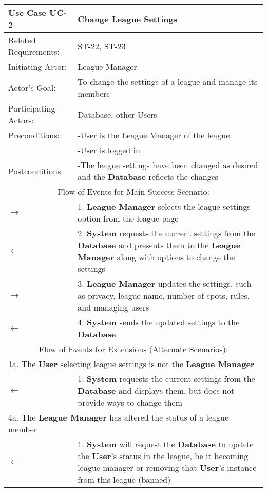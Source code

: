 \begin{centering}
\renewcommand\arraystretch{1.3} %
\begin{longtable}{|p{1.2in} p{5in}|}
\hline
\bfseries{\color{color1}Use Case UC-2} & \bfseries{\color{color1}Change League Settings} \\
\hline
Related Requirements: & ST-22, ST-23\\ 
Initiating Actor:     & League Manager \\
Actor's Goal:         & To change the settings of a league and manage its members \\
Participating Actors:  & Database, other Users \\
Preconditions:        & -User is the League Manager of the league \\
 & -User is logged in \\
Postconditions:       & -The league settings have been changed as desired and the \textbf{Database} reflects the changes \\
\hline
\multicolumn{2}{|c|}{\color{color1}Flow of Events for Main Success Scenario:}\\
\hline
$\rightarrow$ & 1. \textbf{League Manager} selects the league settings option from the league page \\
$\leftarrow$ & 2. \textbf{System} requests the current settings from the \textbf{Database} and presents them to the \textbf{League Manager} along with options to change the settings \\
$\rightarrow$ & 3. \textbf{League Manager} updates the settings, such as privacy, league name, number of spots, rules, and managing users \\
$\leftarrow$ & 4. \textbf{System} sends the updated settings to the \textbf{Database} \\
\hline
\multicolumn{2}{|c|}{\color{color1}Flow of Events for Extensions (Alternate Scenarios):} \\
\hline
\multicolumn{2}{|p{6.2in}|}{1a. The \textbf{User} selecting league settings is not the \textbf{League Manager}} \\
\hline
$\leftarrow$ & 1. \textbf{System} requests the current settings from the \textbf{Database} and displays them, but does not provide ways to change them \\
\hline
\multicolumn{2}{|p{6.2in}|}{4a. The \textbf{League Manager} has altered the status of a league member} \\
\hline
$\leftarrow$ & 1. \textbf{System} will request the \textbf{Database} to update the \textbf{User}'s status in the league, be it becoming league manager or removing that \textbf{User}'s instance from this league (banned)\\
\hline
\end{longtable}
\end{centering}

